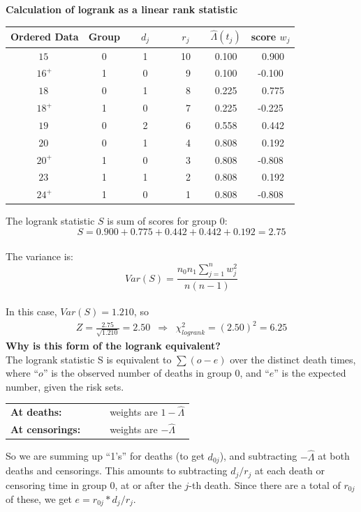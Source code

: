 \documentclass[11pt,slidesonly,semrot,portrait,palatino]{book}
\begin{document}
{\begin{center}
\vspace*{2em}
{\bf Calculation of logrank as a linear rank statistic}\\[2ex]
\begin{tabular}{cccccc}
\hline
Ordered Data & Group & ~~$d_j$~~ & ~~$r_j$~~ &  $\hat\Lambda(t_j)$ & score $w_j$  \\
\hline
$15~$     &   0   &     1   &   10  &  0.100   & ~0.900 \\
$16^+$    &   1   &     0   &   ~9  &  0.100   & -0.100 \\
$18~$     &   0   &     1   &   ~8  &  0.225   & ~0.775 \\
$18^+$    &   1   &     0   &   ~7  &  0.225   & -0.225 \\
$19~$     &   0   &     2   &   ~6  &  0.558   & ~0.442 \\
$20~$     &   0   &     1   &   ~4  &  0.808   & ~0.192 \\
$20^+$    &   1   &     0   &   ~3  &  0.808   & -0.808 \\
$23~$     &   1   &     1   &   ~2  &  0.808   & ~0.192 \\
$24^+$    &   1   &     0   &   ~1  &  0.808   & -0.808 \\ \hline
\end{tabular}
\end{center}
The logrank statistic $S$ is sum of scores for group 0:
\[ S = 0.900 + 0.775 + 0.442 + 0.442 + 0.192=2.75\]
\\[2ex]
The variance is:
\[ Var(S) = \frac{n_0 n_1 \sum_{j=1}^{n} w_j^2 }{n(n-1)} \]
\\[2ex]
In this case,  $Var(S)= 1.210$, so
\begin{eqnarray*}
Z = \frac{2.75}{\sqrt{1.210}} = 2.50
& \Longrightarrow & \chi^2_{logrank} = (2.50)^2 = 6.25
\end{eqnarray*}
{\bf Why is this form of the logrank equivalent?}
\\[2ex]
The logrank statistic S is equivalent to $\sum (o-e)$ over
the distinct death times, where ``$o$'' is the observed number of
deaths in group 0, and ``$e$'' is the expected number, given
the risk sets.
\\[2ex]
\begin{tabular}{ll}
{\bf At deaths:} & weights are $1-\hat\Lambda$\\[2ex]
{\bf At censorings:}~~~~ & weights are $-\hat\Lambda$
\end{tabular}
\vspace*{2em}

\noindent
So we are summing up ``1's'' for deaths (to get $d_{0j}$), and subtracting
$-\hat\Lambda$ at both deaths and censorings.  This amounts
to subtracting $d_j/r_j$ at each death or censoring
time in group 0, at or after the $j$-th death.  Since there are
a total of $r_{0j}$ of these, we get $e = r_{0j} * d_j/r_j$.
}
\end{document}
